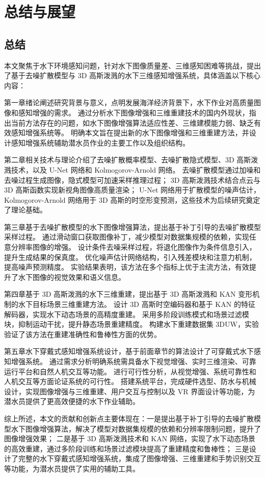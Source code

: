 \chapter{总结与展望}
\section{总结}
本文聚焦于水下环境感知问题，针对水下图像质量差、三维感知困难等挑战，提出了基于去噪扩散模型与 3D 高斯泼溅的水下三维感知增强系统，具体涵盖以下核心内容：

第一章绪论阐述研究背景与意义，点明发展海洋经济背景下，水下作业对高质量图像和感知增强的需求。
通过分析水下图像增强和三维重建技术的国内外现状，指出当前方法存在的问题，如水下图像增强算法适应性差、三维建模能力弱、缺乏有效感知增强系统等。
明确本文旨在提出新的水下图像增强和三维重建方法，并设计感知增强系统辅助潜水员作业的主要工作以及组织结构。

第二章相关技术与理论介绍了去噪扩散概率模型、去噪扩散隐式模型、3D 高斯泼溅技术，以及 U-Net 网络和 Kolmogorov-Arnold 网络。
去噪扩散模型通过加噪和去噪过程生成图像，隐式模型可加速采样推理过程；
3D 高斯泼溅技术结合点云与 3D 高斯函数实现新视角图像高质量渲染；
U-Net 网络用于扩散模型的噪声估计，Kolmogorov-Arnold 网络用于 3D 高斯的时空形变预测，这些技术为后续研究奠定了理论基础。

第三章基于去噪扩散模型的水下图像增强算法，提出基于补丁引导的去噪扩散模型采样过程。
通过滑动窗口获取图像补丁，减少模型对数据集规模的依赖，实现任意分辨率图像的增强。
设计条件去噪采样过程，将退化图像作为条件信息引入，提升生成结果的保真度。
优化噪声估计网络结构，引入残差模块和注意力机制，提高噪声预测精度。
实验结果表明，该方法在多个指标上优于主流方法，有效提升了水下图像的视觉效果和语义信息。

第四章基于 3D 高斯泼溅的水下三维重建，提出基于 3D 高斯泼溅和 KAN 变形机制的水下目标场景三维重建方法。
设计 3D 高斯时空编码器和基于 KAN 的特征解码器，实现水下动态场景的高精度重建。
采用多阶段训练模式和场景过滤模块，抑制运动干扰，提升静态场景重建精度。
构建水下重建数据集 3DUW，实验验证了该方法在重建准确性和鲁棒性方面的优势。

第五章水下穿戴式感知增强系统设计，基于前面章节的算法设计了可穿戴式水下感知增强系统。
通过需求分析明确系统需具备水下视觉增强、实时三维渲染、可靠运行平台和自然人机交互等功能。
进行可行性分析，从视觉增强、系统可靠性和人机交互等方面论证系统的可行性。
搭建系统平台，完成硬件选型、防水与机械设计，实现图像增强与三维重建、用户交互与控制以及 VR 界面设计等功能，为潜水员提供了更高效便捷的水下作业辅助。

综上所述，本文的贡献和创新点主要体现在：一是提出基于补丁引导的去噪扩散模型水下图像增强算法，解决了模型对数据集规模的依赖和分辨率限制问题，提升了图像增强效果；
二是基于 3D 高斯泼溅技术和 KAN 网络，实现了水下动态场景的高效重建，通过多阶段训练和场景过滤模块提高了重建精度和鲁棒性；
三是设计了完整的水下穿戴式感知增强系统，集成了图像增强、三维重建和手势识别交互等功能，为潜水员提供了实用的辅助工具。

